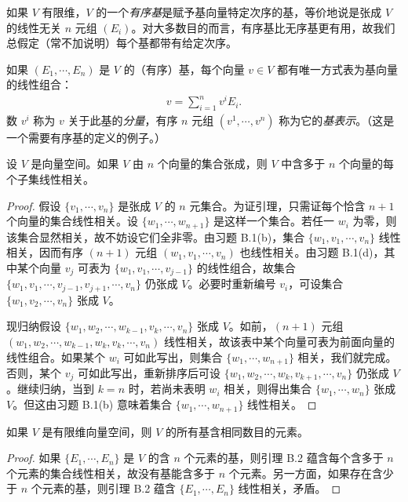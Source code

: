 \documentclass[../../main.tex]{subfiles}
\begin{document}
如果 $V$ 有限维，$V$ 的一个\emph{有序基}是赋予基向量特定次序的基，等价地说是张成 $V$ 的线性无关 $n$ 元组 $(E_i)$。对大多数目的而言，有序基比无序基更有用，故我们总假定（常不加说明）每个基都带有给定次序。

如果 $(E_1,\cdots ,E_n)$ 是 $V$ 的（有序）基，每个向量 $v\in V$ 都有唯一方式表为基向量的线性组合：
\begin{align*}
v=\sum_{i=1}^n v^i E_i.
\end{align*}
数 $v^i$ 称为 $v$ 关于此基的\emph{分量}，有序 $n$ 元组 $(v^1,\cdots ,v^n)$ 称为它的\emph{基表示}。（这是一个需要有序基的定义的例子。）

\begin{lemma}\label{lemma:appB-spanning-dependence}
设 $V$ 是向量空间。如果 $V$ 由 $n$ 个向量的集合张成，则 $V$ 中含多于 $n$ 个向量的每个子集线性相关。
\end{lemma}

\begin{proof}
假设 $\{v_1,\cdots ,v_n\}$ 是张成 $V$ 的 $n$ 元集合。为证引理，只需证每个恰含 $n+1$ 个向量的集合线性相关。设 $\{w_1,\cdots ,w_{n+1}\}$ 是这样一个集合。若任一 $w_i$ 为零，则该集合显然相关，故不妨设它们全非零。由习题 B.1(b)，集合 $\{w_1,v_1,\cdots ,v_n\}$ 线性相关，因而有序 $(n+1)$ 元组 $(w_1,v_1,\cdots ,v_n)$ 也线性相关。由习题 B.1(d)，其中某个向量 $v_j$ 可表为 $\{w_1,v_1,\cdots ,v_{j-1}\}$ 的线性组合，故集合 $\{w_1,v_1,\cdots ,v_{j-1},v_{j+1},\cdots ,v_n\}$ 仍张成 $V$。必要时重新编号 $v_i$，可设集合 $\{w_1,v_2,\cdots ,v_n\}$ 张成 $V$。

现归纳假设 $\{w_1,w_2,\cdots ,w_{k-1},v_k,\cdots ,v_n\}$ 张成 $V$。如前，$(n+1)$ 元组 $(w_1,w_2,\cdots ,w_{k-1},w_k,v_k,\cdots ,v_n)$ 线性相关，故该表中某个向量可表为前面向量的线性组合。如果某个 $w_i$ 可如此写出，则集合 $\{w_1,\cdots ,w_{n+1}\}$ 相关，我们就完成。否则，某个 $v_j$ 可如此写出，重新排序后可设 $\{w_1,w_2,\cdots ,w_k,v_{k+1},\cdots ,v_n\}$ 仍张成 $V$。继续归纳，当到 $k=n$ 时，若尚未表明 $w_i$ 相关，则得出集合 $\{w_1,\cdots ,w_n\}$ 张成 $V$。但这由习题 B.1(b) 意味着集合 $\{w_1,\cdots ,w_{n+1}\}$ 线性相关。
\end{proof}

\begin{proposition}\label{proposition:appB-basis-cardinality}
如果 $V$ 是有限维向量空间，则 $V$ 的所有基含相同数目的元素。
\end{proposition}

\begin{proof}
如果 $\{E_1,\cdots ,E_n\}$ 是 $V$ 的含 $n$ 个元素的基，则引理 B.2 蕴含每个含多于 $n$ 个元素的集合线性相关，故没有基能含多于 $n$ 个元素。另一方面，如果存在含少于 $n$ 个元素的基，则引理 B.2 蕴含 $\{E_1,\cdots ,E_n\}$ 线性相关，矛盾。
\end{proof}
\end{document}
